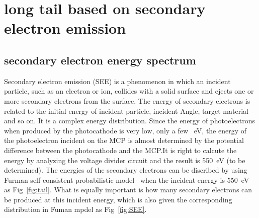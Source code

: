 \documentclass{article}
\begin{document}
\section{long tail based on secondary electron emission}\label{sec:see}


\subsection{secondary electron energy spectrum}
Secondary electron emission (SEE) is a phenomenon in which an incident particle, such as an electron or ion, 
collides with a solid surface and ejects one or more secondary electrons from the surface. 
The energy of secondary electrons is related to the initial energy of incident particle, incident Angle, target material and so on. 
It is a complex energy distribution.
Since the energy of photoelectrons when produced by the photocathode is very low, only a few \SI{}{eV}, 
the energy of the photoelectron incident on the MCP is almost determined by the potential difference 
between the photocathode and the MCP.\@ It is right to calcute the energy by analyzing the voltage divider circuit and the result is \SI{550}{eV} (to be determined).
The energies of the secondary electrons can be discribed by using Furman self-consistent probabilistic model~\cite{2002Probabilistic} 
when the incident energy is \SI{550}{eV} as Fig~\ref{fig:tail}. 
What is equally important is how many secondary electrons can be produced at this incident energy, 
which is also given the corresponding distribution in Fuman mpdel\cite{2002Probabilistic} as Fig~\ref{fig:SEE}.
\end{document}

